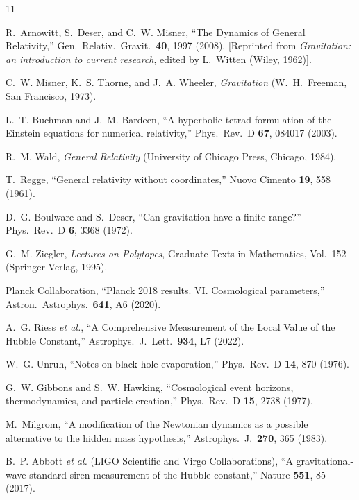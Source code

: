 \documentclass[aps,prd,preprint,superscriptaddress,showpacs,preprintnumbers,amsmath,amssymb,nofootinbib]{revtex4-2}
\begin{document}
\begin{thebibliography}{11}

R.~Arnowitt, S.~Deser, and C.~W. Misner, ``The Dynamics of General Relativity,'' Gen.\ Relativ.\ Gravit.\ \textbf{40}, 1997 (2008). [Reprinted from \emph{Gravitation: an introduction to current research}, edited by L.~Witten (Wiley, 1962)].

C.~W. Misner, K.~S. Thorne, and J.~A. Wheeler, \emph{Gravitation} (W.~H.~Freeman, San Francisco, 1973).

L.~T. Buchman and J.~M. Bardeen, ``A hyperbolic tetrad formulation of the Einstein equations for numerical relativity,'' Phys.\ Rev.\ D \textbf{67}, 084017 (2003).

R.~M. Wald, \emph{General Relativity} (University of Chicago Press, Chicago, 1984).

T.~Regge, ``General relativity without coordinates,'' Nuovo Cimento \textbf{19}, 558 (1961).

D.~G. Boulware and S.~Deser, ``Can gravitation have a finite range?'' Phys.\ Rev.\ D \textbf{6}, 3368 (1972).

G.~M. Ziegler, \emph{Lectures on Polytopes}, Graduate Texts in Mathematics, Vol.~152 (Springer-Verlag, 1995).

Planck Collaboration, ``Planck 2018 results. VI. Cosmological parameters,'' Astron.\ Astrophys.\ \textbf{641}, A6 (2020).

A.~G. Riess \textit{et al.}, ``A Comprehensive Measurement of the Local Value of the Hubble Constant,'' Astrophys.\ J.\ Lett.\ \textbf{934}, L7 (2022).

W.~G. Unruh, ``Notes on black-hole evaporation,'' Phys.\ Rev.\ D \textbf{14}, 870 (1976).

G.~W. Gibbons and S.~W. Hawking, ``Cosmological event horizons, thermodynamics, and particle creation,'' Phys.\ Rev.\ D \textbf{15}, 2738 (1977).

M.~Milgrom, ``A modification of the Newtonian dynamics as a possible alternative to the hidden mass hypothesis,'' Astrophys.\ J.\ \textbf{270}, 365 (1983).

B.~P. Abbott \textit{et al.} (LIGO Scientific and Virgo Collaborations), ``A gravitational-wave standard siren measurement of the Hubble constant,'' Nature \textbf{551}, 85 (2017).

\end{thebibliography}
\end{document}
